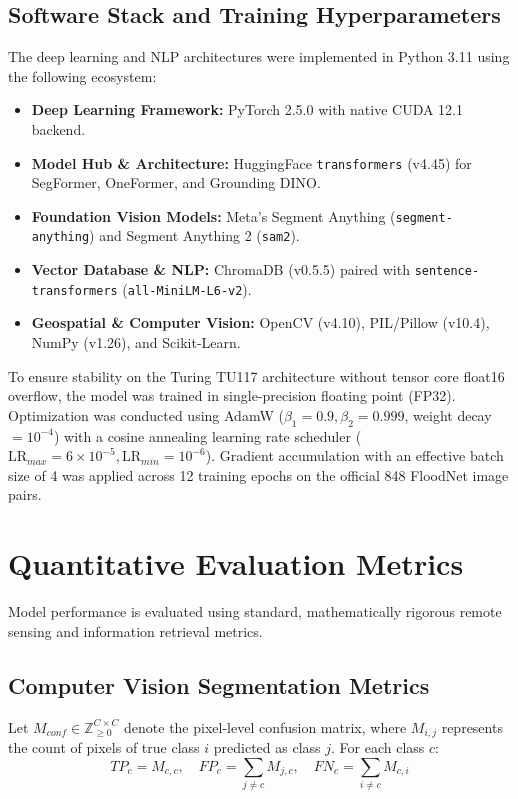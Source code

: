 \subsection{Software Stack and Training Hyperparameters}
The deep learning and NLP architectures were implemented in Python 3.11 using the following ecosystem:
\begin{itemize}
    \item \textbf{Deep Learning Framework:} PyTorch 2.5.0 with native CUDA 12.1 backend.
    \item \textbf{Model Hub \& Architecture:} HuggingFace \texttt{transformers} (v4.45) for SegFormer, OneFormer, and Grounding DINO.
    \item \textbf{Foundation Vision Models:} Meta's Segment Anything (\texttt{segment-anything}) and Segment Anything 2 (\texttt{sam2}).
    \item \textbf{Vector Database \& NLP:} ChromaDB (v0.5.5) paired with \texttt{sentence-transformers} (\texttt{all-MiniLM-L6-v2}).
    \item \textbf{Geospatial \& Computer Vision:} OpenCV (v4.10), PIL/Pillow (v10.4), NumPy (v1.26), and Scikit-Learn.
\end{itemize}

To ensure stability on the Turing TU117 architecture without tensor core float16 overflow, the model was trained in single-precision floating point (FP32). Optimization was conducted using AdamW ($\beta_1 = 0.9, \beta_2 = 0.999$, weight decay $= 10^{-4}$) with a cosine annealing learning rate scheduler ($\text{LR}_{max} = 6 \times 10^{-5}, \text{LR}_{min} = 10^{-6}$). Gradient accumulation with an effective batch size of 4 was applied across 12 training epochs on the official 848 FloodNet image pairs.

\section{Quantitative Evaluation Metrics}
Model performance is evaluated using standard, mathematically rigorous remote sensing and information retrieval metrics.

\subsection{Computer Vision Segmentation Metrics}
Let $M_{conf} \in \mathbb{Z}_{\ge 0}^{C \times C}$ denote the pixel-level confusion matrix, where $M_{i, j}$ represents the count of pixels of true class $i$ predicted as class $j$. For each class $c$:
\begin{equation}
    TP_c = M_{c, c}, \quad FP_c = \sum_{j \neq c} M_{j, c}, \quad FN_c = \sum_{i \neq c} M_{c, i}
\end{equation}

